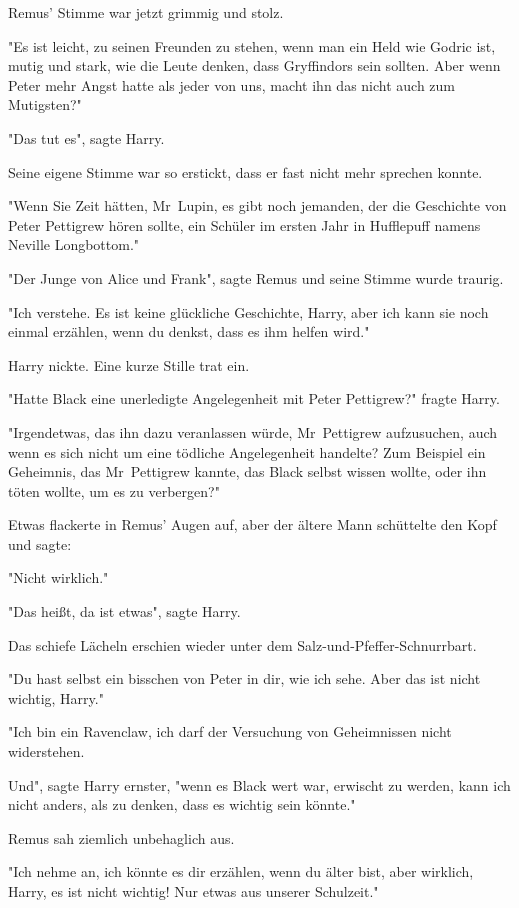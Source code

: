 {Remus' Stimme war jetzt grimmig und stolz.

"Es ist leicht, zu seinen Freunden zu stehen, wenn man ein Held wie Godric ist, mutig und stark, wie die Leute denken, dass Gryffindors sein sollten. Aber wenn Peter mehr Angst hatte als jeder von uns, macht ihn das nicht auch zum Mutigsten?"

"Das tut es", sagte Harry.

Seine eigene Stimme war so erstickt, dass er fast nicht mehr sprechen konnte.

"Wenn Sie Zeit hätten, Mr~Lupin, es gibt noch jemanden, der die Geschichte von Peter Pettigrew hören sollte, ein Schüler im ersten Jahr in Hufflepuff namens Neville Longbottom."

"Der Junge von Alice und Frank", sagte Remus und seine Stimme wurde traurig.

"Ich verstehe. Es ist keine glückliche Geschichte, Harry, aber ich kann sie noch einmal erzählen, wenn du denkst, dass es ihm helfen wird."

Harry nickte. Eine kurze Stille trat ein.

"Hatte Black eine unerledigte Angelegenheit mit Peter Pettigrew?" fragte Harry.

"Irgendetwas, das ihn dazu veranlassen würde, Mr~Pettigrew aufzusuchen, auch wenn es sich nicht um eine tödliche Angelegenheit handelte? Zum Beispiel ein Geheimnis, das Mr~Pettigrew kannte, das Black selbst wissen wollte, oder ihn töten wollte, um es zu verbergen?"

Etwas flackerte in Remus' Augen auf, aber der ältere Mann schüttelte den Kopf und sagte:

"Nicht wirklich."

"Das heißt, da ist etwas", sagte Harry.

Das schiefe Lächeln erschien wieder unter dem Salz-und-Pfeffer-Schnurrbart.

"Du hast selbst ein bisschen von Peter in dir, wie ich sehe. Aber das ist nicht wichtig, Harry."

"Ich bin ein Ravenclaw, ich darf der Versuchung von Geheimnissen nicht widerstehen.

Und", sagte Harry ernster, "wenn es Black wert war, erwischt zu werden, kann ich nicht anders, als zu denken, dass es wichtig sein könnte."

Remus sah ziemlich unbehaglich aus.

"Ich nehme an, ich könnte es dir erzählen, wenn du älter bist, aber wirklich, Harry, es ist nicht wichtig! Nur etwas aus unserer Schulzeit."

}

